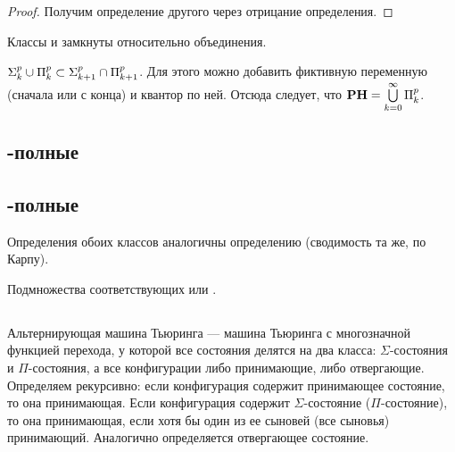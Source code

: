 \begin{proof}
Получим определение другого через отрицание определения.
\end{proof}

\begin{note}
Классы  и  замкнуты относительно объединения.
\end{note}

\begin{note}
$\textbf{$\Sigma_{k}^p$} \cup \textbf{$\Pi_{k}^p$} \subset \textbf{$\Sigma_{k + 1}^p$} \cap \textbf{$\Pi_{k + 1}^p$}$. Для этого можно добавить фиктивную переменную (сначала или с конца) и квантор по ней. Отсюда следует, что $\textbf{PH} = \bigcup\limits_{k = 0}^\infty \textbf{$\Pi_{k}^p$}$.
\end{note}

\subsection{-полные}

\subsection{-полные}

\begin{definition}
Определения обоих классов аналогичны определению \npc (сводимость та же, по Карпу).
\end{definition}

\begin{note}
Подмножества соответствующих  или .
\end{note}

\subsection{}

\subsection{}

\begin{definition}
Альтернирующая машина Тьюринга --- машина Тьюринга с многозначной функцией перехода, у которой все состояния делятся на два класса: $\Sigma$-состояния и $\Pi$-состояния, а все конфигурации либо принимающие, либо отвергающие. Определяем рекурсивно: если конфигурация содержит принимающее состояние, то она принимающая. Если конфигурация содержит $\Sigma$-состояние ($\Pi$-состояние), то она принимающая, если хотя бы один из ее сыновей (все сыновья) принимающий. Аналогично определяется отвергающее состояние.
\end{definition}

